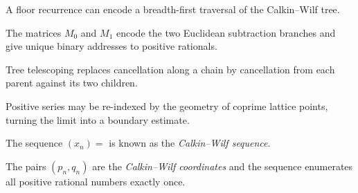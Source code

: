 \begin{takeaways}
\item A floor recurrence can encode a breadth-first traversal of the Calkin--Wilf tree.
\item The matrices $M_0$ and $M_1$ encode the two Euclidean subtraction branches and give unique binary addresses to positive rationals.
\item Tree telescoping replaces cancellation along a chain by cancellation from each parent against its two children.
\item Positive series may be re-indexed by the geometry of coprime lattice points, turning the limit into a boundary estimate.
\item The sequence $(x_n) = $ is known as the \emph{Calkin--Wilf sequence}.
\item The pairs $(p_n,q_n)$ are the \emph{Calkin--Wilf coordinates} and the sequence enumerates all positive rational numbers exactly once.

\end{takeaways}
